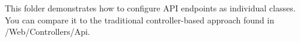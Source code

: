 This folder demonstrates how to configure API endpoints as individual classes. You can compare it to the traditional controller-\/based approach found in /\+Web/\+Controllers/\+Api. 